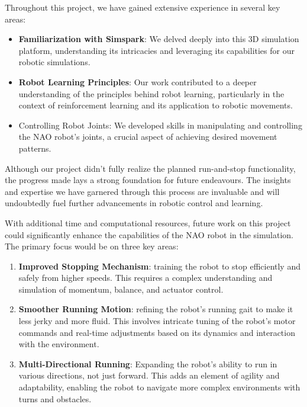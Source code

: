 \documentclass[conference]{IEEEtran}
\begin{document}
Throughout this project, we have gained extensive experience in several key areas:

\begin{itemize}
    \item \textbf{Familiarization with Simspark}: We delved deeply into this 3D simulation platform, understanding its intricacies and leveraging its capabilities for our robotic simulations.
    \item \textbf{Robot Learning Principles}: Our work contributed to a deeper understanding of the principles behind robot learning, particularly in the context of reinforcement learning and its application to robotic movements.
          \item{Controlling Robot Joints: We developed skills in manipulating and controlling the NAO robot's joints, a crucial aspect of achieving desired movement patterns.}
\end{itemize}

Although our project didn't fully realize the planned run-and-stop functionality, the progress made lays a strong foundation for future endeavours. The insights and expertise we have garnered through this process are invaluable and will undoubtedly fuel further advancements in robotic control and learning.

With additional time and computational resources, future work on this project could significantly enhance the capabilities of the NAO robot in the simulation. The primary focus would be on three key areas:

\begin{enumerate}
    \item \textbf{Improved Stopping Mechanism}: training the robot to stop efficiently and safely from higher speeds. This requires a complex understanding and simulation of momentum, balance, and actuator control.
    \item \textbf{Smoother Running Motion}: refining the robot's running gait to make it less jerky and more fluid. This involves intricate tuning of the robot's motor commands and real-time adjustments based on its dynamics and interaction with the environment.
    \item \textbf{Multi-Directional Running}: Expanding the robot's ability to run in various directions, not just forward. This adds an element of agility and adaptability, enabling the robot to navigate more complex environments with turns and obstacles.
\end{enumerate}
\end{document}
